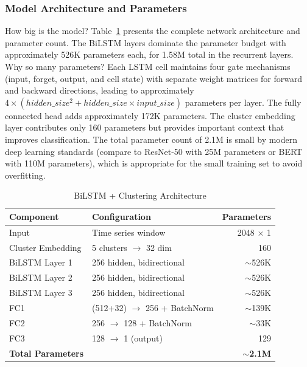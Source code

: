 \documentclass[letterpaper]{article} %
\begin{document}
\subsubsection{Model Architecture and Parameters}

How big is the model? Table~\ref{tab:bilstm_architecture} presents the complete network architecture and parameter count. The BiLSTM layers dominate the parameter budget with approximately 526K parameters each, for 1.58M total in the recurrent layers. Why so many parameters? Each LSTM cell maintains four gate mechanisms (input, forget, output, and cell state) with separate weight matrices for forward and backward directions, leading to approximately $4 \times (hidden\_size^2 + hidden\_size \times input\_size)$ parameters per layer. The fully connected head adds approximately 172K parameters. The cluster embedding layer contributes only 160 parameters but provides important context that improves classification. The total parameter count of 2.1M is small by modern deep learning standards (compare to ResNet-50 with 25M parameters or BERT with 110M parameters), which is appropriate for the small training set to avoid overfitting.

\begin{table}[h]
\centering
\caption{BiLSTM + Clustering Architecture}
\label{tab:bilstm_architecture}
\begin{tabular}{@{}llr@{}}
\toprule
\textbf{Component} & \textbf{Configuration} & \textbf{Parameters} \\
\midrule
Input & Time series window & 2048 $\times$ 1 \\
Cluster Embedding & 5 clusters $\rightarrow$ 32 dim & 160 \\
BiLSTM Layer 1 & 256 hidden, bidirectional & $\sim$526K \\
BiLSTM Layer 2 & 256 hidden, bidirectional & $\sim$526K \\
BiLSTM Layer 3 & 256 hidden, bidirectional & $\sim$526K \\
FC1 & (512+32) $\rightarrow$ 256 + BatchNorm & $\sim$139K \\
FC2 & 256 $\rightarrow$ 128 + BatchNorm & $\sim$33K \\
FC3 & 128 $\rightarrow$ 1 (output) & 129 \\
\midrule
\textbf{Total Parameters} & & \textbf{$\sim$2.1M} \\
\bottomrule
\end{tabular}
\end{table}
\end{document}

